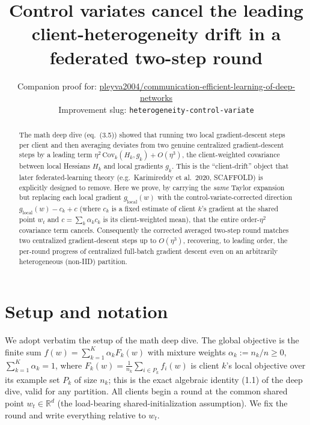 \documentclass[11pt]{article}
\title{Control variates cancel the leading client-heterogeneity drift in a federated two-step round}
\author{Companion proof for: \href{https://github.com/pleyva2004/communication-efficient-learning-of-deep-networks}{pleyva2004/communication-efficient-learning-of-deep-networks} \\ \small Improvement slug: \texttt{heterogeneity-control-variate}}
\date{}
\theoremstyle{definition}
\theoremstyle{remark}
\begin{document}
\maketitle

\begin{abstract}
The math deep dive (eq.~(3.5)) showed that running two local gradient-descent steps per
client and then averaging deviates from two genuine centralized gradient-descent steps by a
leading term $\eta^2\,\mathrm{Cov}_k(H_k,g_k)+O(\eta^3)$, the client-weighted covariance
between local Hessians $H_k$ and local gradients $g_k$. This is the ``client-drift'' object
that later federated-learning theory (e.g.\ Karimireddy et al.\ 2020, SCAFFOLD) is explicitly
designed to remove. Here we prove, by carrying the \emph{same} Taylor expansion but replacing
each local gradient $g_{\mathrm{local}}(w)$ with the control-variate-corrected direction
$g_{\mathrm{local}}(w)-c_k+c$ (where $c_k$ is a fixed estimate of client $k$'s gradient at the
shared point $w_t$ and $c=\sum_k\alpha_k c_k$ is its client-weighted mean), that the entire
order-$\eta^2$ covariance term cancels. Consequently the corrected averaged two-step round
matches two centralized gradient-descent steps up to $O(\eta^3)$, recovering, to leading
order, the per-round progress of centralized full-batch gradient descent even on an
arbitrarily heterogeneous (non-IID) partition.
\end{abstract}

\section*{Setup and notation}

We adopt verbatim the setup of the math deep dive. The global objective is the finite sum
$f(w)=\sum_{k=1}^{K}\alpha_k F_k(w)$ with mixture weights $\alpha_k:=n_k/n\ge0$,
$\sum_{k=1}^{K}\alpha_k=1$, where $F_k(w)=\frac{1}{n_k}\sum_{i\in P_k}f_i(w)$ is client $k$'s
local objective over its example set $P_k$ of size $n_k$; this is the exact algebraic
identity (1.1) of the deep dive, valid for any partition. All clients begin a round at the
common shared point $w_t\in\mathbb{R}^d$ (the load-bearing shared-initialization assumption).
We fix the round and write everything relative to $w_t$.
\end{document}
